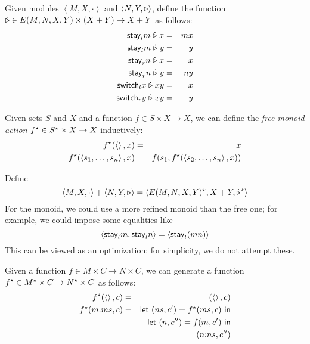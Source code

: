 \begin{defn}[$R$-similarity]
\begin{theorem}
\begin{lemma}
\begin{theorem}[No products]
\begin{lemma}
\begin{defn}
\begin{theorem}
\begin{theorem}
\begin{corollary}[Hylomorphism]
\begin{defn}
\begin{defn}
\begin{defn}[Symmetrization]
\begin{theorem}
\begin{definition}
Given modules $\left<M,X,\cdot\right>$ and $\left<N,Y,\triangleright\right>$, define
the function $\dot{\triangleright} \in E(M,N,X,Y) \times (X + Y) \to X + Y$ as follows:
\begin{eqnarray*}
    \mathsf{stay}_lm \mathrel{\dot{\triangleright}}  x &=&  mx \\
    \mathsf{stay}_lm \mathrel{\dot{\triangleright}}  y &=&  y \\
    \mathsf{stay}_rn \mathrel{\dot{\triangleright}}  x &=&  x \\
    \mathsf{stay}_rn \mathrel{\dot{\triangleright}}  y &=&  ny \\
    \mathsf{switch}_lx \mathrel{\dot{\triangleright}} xy &=&  x \\
    \mathsf{switch}_ry \mathrel{\dot{\triangleright}} xy &=&  y
\end{eqnarray*}
\end{definition}

\begin{definition}
Given sets $S$ and $X$ and a function $f \in S \times X \to X$, we can define
the \emph{free monoid action} $f^\star \in S^\star \times X \to X$ inductively:
\begin{eqnarray*}
    f^\star(\left<\right>,x) &=& x \\
    f^\star(\left<s_1,\ldots,s_n\right>,x) &=& f(s_1,f^\star(\left<s_2,\ldots,s_n\right>,x))
\end{eqnarray*}
\end{definition}

\begin{definition}
Define
\[\left<M,X,\cdot\right>+\left<N,Y,\triangleright\right> =
\left<E(M,N,X,Y)^\star,X+Y,\dot{\triangleright}^\star\right>\]
For the monoid, we could use a more refined monoid than the free one; for
example, we could impose some equalities like
\[\left<\mathsf{stay}_lm,\mathsf{stay}_ln\right> = \left<\mathsf{stay}_l(mn)\right>\]
This can be viewed as an optimization; for simplicity, we do not attempt
these.
\end{definition}

\begin{definition}
Given a function $f \in M \times C \to N \times C$, we can generate a
function $f^\star \in M^\star \times C \to N^\star \times C$ as follows:
\begin{eqnarray*}
    f^\star(\left<\right>,c) &=& (\left<\right>,c) \\
    f^\star(m \mathord{:} ms,c)
    &=& \mathsf{let}\  (ns, c') = f^\star(ms, c) \ \mathsf{in} \\
    & & \mathsf{let}\  (n, c'') = f(m, c') \ \mathsf{in} \\
    & & (n \mathord{:} ns,c'')
\end{eqnarray*}
\end{definition}


\end{theorem}
\end{defn}
\end{defn}
\end{defn}
\end{corollary}
\end{theorem}
\end{theorem}
\end{defn}
\end{lemma}
\end{theorem}
\end{lemma}
\end{theorem}
\end{defn}
